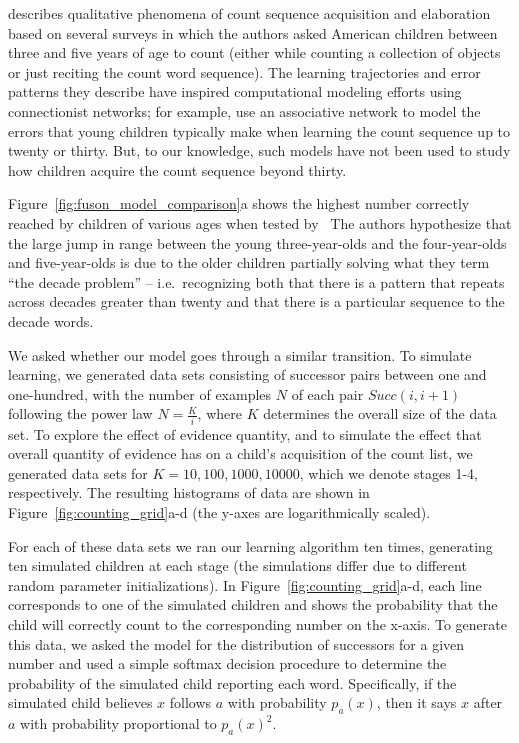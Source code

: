 \documentclass[10pt,letterpaper]{article}
\begin{document}
\cite{FusRicBriar1982} describes qualitative phenomena of count
sequence acquisition and elaboration based on several surveys in which
the authors asked American children between three and five years of
age to count (either while counting a collection of objects or just
reciting the count word sequence). The learning trajectories and error
patterns they describe have inspired computational modeling efforts
using connectionist networks; for example, \citet{ma1989modeling} use
an associative network to model the errors that young children
typically make when learning the count sequence up to twenty or
thirty. But, to our knowledge, such models have not been used to study
how children acquire the count sequence beyond thirty.

Figure~\ref{fig:fuson_model_comparison}a shows the highest number
correctly reached by children of various ages when tested
by~\citeauthor{FusRicBriar1982} The authors hypothesize that the large
jump in range between the young three-year-olds and the four-year-olds
and five-year-olds is due to the older children partially solving what
they term ``the decade problem'' -- i.e.~recognizing both that there
is a pattern that repeats across decades greater than twenty and that
there is a particular sequence to the decade words.

We asked whether our model goes through a similar transition. To
simulate learning, we generated data sets consisting of successor
pairs between one and one-hundred, with the number of examples $N$ of each
pair $Succ(i, i+1)$ following the power law $N=\frac{K}{i}$, where $K$
determines the overall size of the data set. To explore the effect of
evidence quantity, and to simulate the effect that overall quantity
of evidence has on a child's acquisition of the count list, we
generated data sets for $K=10, 100, 1000, 10000$, which we denote
stages 1-4, respectively. The resulting histograms of data are shown in
Figure~\ref{fig:counting_grid}a-d (the y-axes are logarithmically
scaled).

For each of these data sets we ran our learning algorithm ten times,
generating ten simulated children at each stage (the simulations
differ due to different random parameter initializations). In
Figure~\ref{fig:counting_grid}a-d, each line corresponds to one of the
simulated children and shows the probability that the child will
correctly count to the corresponding number on the x-axis. To generate
this data, we asked the model for the distribution of successors for a
given number and used a simple softmax decision procedure to
determine the probability of the simulated child reporting each word.
Specifically, if the simulated child believes $x$ follows $a$
with probability $p_a(x)$, then it says $x$ after $a$ with probability
proportional to $p_a(x)^2 $.
\end{document}
